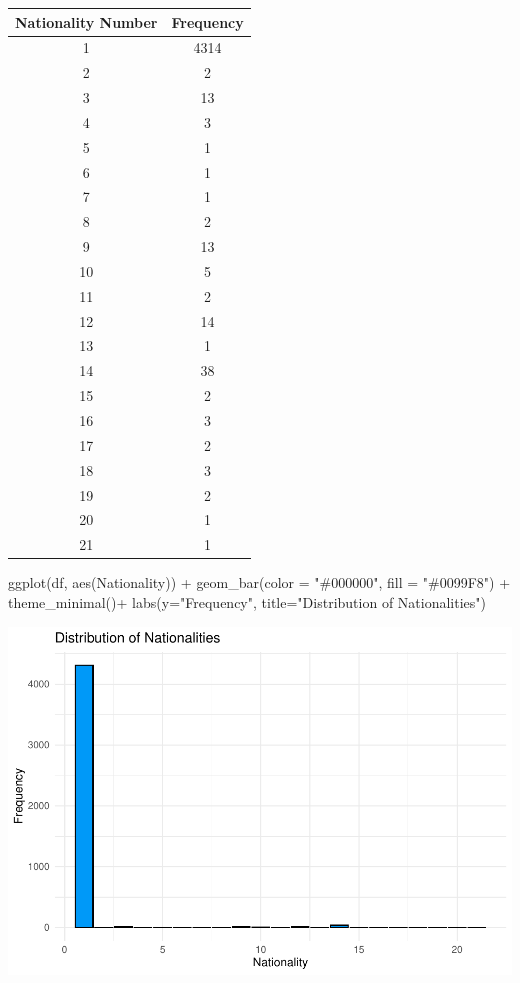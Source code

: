 \documentclass[
]{article}
\newenvironment{Shaded}{\begin{snugshade}}{\end{snugshade}}
\newcommand{\AttributeTok}[1]{\textcolor[rgb]{0.77,0.63,0.00}{#1}}
\newcommand{\FunctionTok}[1]{\textcolor[rgb]{0.00,0.00,0.00}{#1}}
\newcommand{\NormalTok}[1]{#1}
\newcommand{\SpecialCharTok}[1]{\textcolor[rgb]{0.00,0.00,0.00}{#1}}
\newcommand{\StringTok}[1]{\textcolor[rgb]{0.31,0.60,0.02}{#1}}
\begin{document}
\begin{table}
\centering
\begin{tabular}{c|c}
\hline
Nationality Number & Frequency\\
\hline
1 & 4314\\
\hline
2 & 2\\
\hline
3 & 13\\
\hline
4 & 3\\
\hline
5 & 1\\
\hline
6 & 1\\
\hline
7 & 1\\
\hline
8 & 2\\
\hline
9 & 13\\
\hline
10 & 5\\
\hline
11 & 2\\
\hline
12 & 14\\
\hline
13 & 1\\
\hline
14 & 38\\
\hline
15 & 2\\
\hline
16 & 3\\
\hline
17 & 2\\
\hline
18 & 3\\
\hline
19 & 2\\
\hline
20 & 1\\
\hline
21 & 1\\
\hline
\end{tabular}
\end{table}

\begin{Shaded}
\begin{Highlighting}[]
\FunctionTok{ggplot}\NormalTok{(df, }\FunctionTok{aes}\NormalTok{(Nationality)) }\SpecialCharTok{+}
  \FunctionTok{geom\_bar}\NormalTok{(}\AttributeTok{color =} \StringTok{"\#000000"}\NormalTok{, }\AttributeTok{fill =} \StringTok{"\#0099F8"}\NormalTok{) }\SpecialCharTok{+} \FunctionTok{theme\_minimal}\NormalTok{()}\SpecialCharTok{+}
  \FunctionTok{labs}\NormalTok{(}\AttributeTok{y=}\StringTok{"Frequency"}\NormalTok{, }\AttributeTok{title=}\StringTok{"Distribution of Nationalities"}\NormalTok{)}
\end{Highlighting}
\end{Shaded}

\includegraphics{midterm_files/figure-latex/unnamed-chunk-6-1.pdf}
\end{document}
